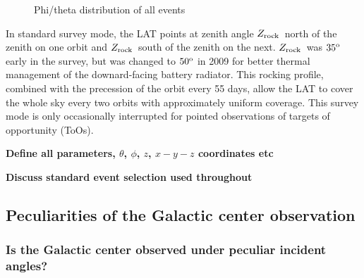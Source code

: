 \documentclass[aps,twocolumn,prd,superscriptaddress,showpacs,nofootinbib,fixfloat]{revtex4}
\newcommand{\degree}{^{\rm o}}
\newcommand{\zrock}{$Z_{\rm rock}$}
\begin{document}
\begin{figure}[h]
  \begin{center}
  \end{center}
  \caption{Phi/theta distribution of all events}
  \label{fig:phiThetaDist}
\end{figure}

In standard survey mode, the LAT points at zenith angle \zrock\ north of the
zenith on one orbit and \zrock\ south of the zenith on the next.  \zrock\ was
$35\degree$ early in the survey, but was changed to $50\degree$ in 2009 for
better thermal management of the downard-facing battery radiator.  This
rocking profile, combined with the precession of the orbit every 55 days,
allow the LAT to cover the whole sky every two orbits with approximately
uniform coverage.  This survey mode is only occasionally interrupted for
pointed observations of targets of opportunity (ToOs). 

\textbf{Define all parameters, $\theta$, $\phi$, $z$, $x-y-z$ coordinates etc}

\textbf{Discuss standard event selection used throughout}

\subsection{Peculiarities of the Galactic center observation}

\subsubsection{Is the Galactic center observed under peculiar incident angles?}
\end{document}
